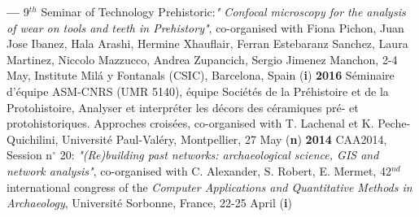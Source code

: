 \documentclass{article}
\begin{document}
\smallbreak
\textbf{--- }9${}^{th}$ Seminar of Technology Prehistoric:\textit{" Confocal microscopy for the analysis of wear on tools and teeth in Prehistory"}, co-organised with Fiona Pichon, Juan Jose Ibanez, Hala Arashi, Hermine Xhauflair, Ferran Estebaranz Sanchez, Laura Martinez, Niccolo Mazzucco, Andrea Zupancich, Sergio Jimenez Manchon, 2-4 May, Institute Milá y Fontanals (CSIC), Barcelona, Spain (\textbf{i})
\smallbreak
\textbf{2016 }S\'{e}minaire d'\'{e}quipe ASM-CNRS (UMR 5140), \'{e}quipe Soci\'{e}t\'{e}s de la Pr\'{e}histoire et de la Protohistoire, Analyser et interpr\'{e}ter les d\'{e}cors des c\'{e}ramiques pr\'{e}- et protohistoriques. Approches crois\'{e}es, co-organised with T. Lachenal et K. Peche-Quichilini, Universit\'{e} Paul-Val\'{e}ry, Montpellier, 27 May (\textbf{n})
\smallbreak
\textbf{2014 }CAA2014, Session n$\mathrm{{}^\circ}$ 20: \textit{"(Re)building past networks: archaeological science, GIS and network analysis"}, co-organised with C. Alexander, S. Robert, E. Mermet, 42${}^{nd}$ international congress of the \textit{Computer Applications and Quantitative Methods in Archaeology}, Universit\'{e} Sorbonne, France, 22-25 April (\textbf{i})
\bigbreak
\end{document}
